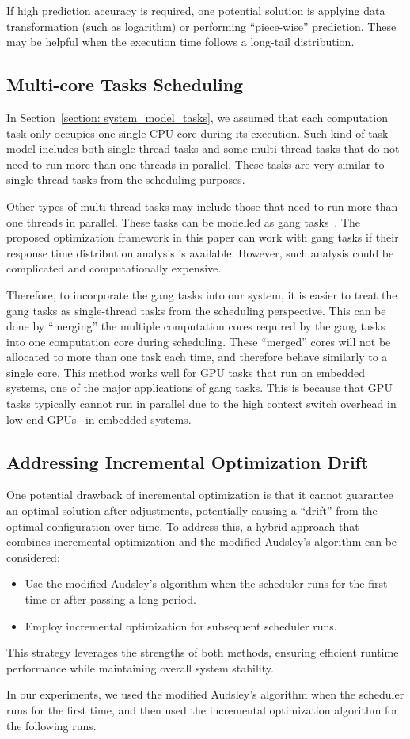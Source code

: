     If high prediction accuracy is required, one potential solution is applying data transformation (such as logarithm) or performing ``piece-wise'' prediction. These may be helpful when the execution time follows a long-tail distribution.

    \subsection{Multi-core Tasks Scheduling}
    \label{section: gang}
    In Section~\ref{section: system_model_tasks}, we assumed that each computation task only occupies one single CPU core during its execution. 
    Such kind of task model includes both single-thread tasks and some multi-thread tasks that do not need to run more than one threads in parallel.
    These tasks are very similar to single-thread tasks from the scheduling purposes.
    
    Other types of multi-thread tasks may include those that need to run more than one threads in parallel. These tasks can be modelled as gang tasks~\cite{Goossens2010GangFS}. 
    The proposed optimization framework in this paper can work with gang tasks if their response time distribution analysis is available. However, such analysis could be complicated and computationally expensive. 

    Therefore, to incorporate the gang tasks into our system, it is easier to treat the gang tasks as single-thread tasks from the scheduling perspective. This can be done by ``merging'' the multiple computation cores required by the gang tasks into one computation core during scheduling. 
    These ``merged'' cores will not be allocated to more than one task each time, and therefore behave similarly to a single core.
    This method works well for GPU tasks that run on embedded systems, one of the major applications of gang tasks. This is because that GPU tasks typically cannot run in parallel due to the high context switch overhead in low-end GPUs~\cite{Olmedo2020DissectingTC} in embedded systems.

    
\subsection{Addressing Incremental Optimization Drift}  
\label{sec: drift}
One potential drawback of incremental optimization is that it cannot guarantee an optimal solution after adjustments, potentially causing a ``drift'' from the optimal configuration over time. To address this, a hybrid approach that combines incremental optimization and the modified Audsley's algorithm can be considered:
\begin{itemize}
    \item Use the modified Audsley's algorithm when the scheduler runs for the first time or after passing a long period.
    \item Employ incremental optimization for subsequent scheduler runs.
\end{itemize}
This strategy leverages the strengths of both methods, ensuring efficient runtime performance while maintaining overall system stability.

In our experiments, we used the modified Audsley's algorithm when the scheduler runs for the first time, and then used the incremental optimization algorithm for the following runs.
    